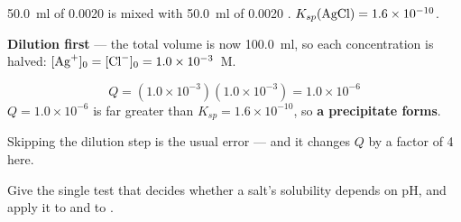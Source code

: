 \documentclass{apchem-notes}
\begin{document}
\begin{workedexample}
\SI{50.0}{\milli\litre} of \SI{0.0020}{\Molar}  is mixed with
\SI{50.0}{\milli\litre} of \SI{0.0020}{\Molar} .
$K_{sp}(\ce{AgCl}) = 1.6\times10^{-10}$.

\textbf{Dilution first} --- the total volume is now
\SI{100.0}{\milli\litre}, so each concentration is halved:
$[\ce{Ag+}]_0 = [\ce{Cl-}]_0 = 1.0\times10^{-3}$~M.

\[ Q = (1.0\times10^{-3})(1.0\times10^{-3}) = 1.0\times10^{-6} \]
$Q = 1.0\times10^{-6}$ is far greater than
$K_{sp} = 1.6\times10^{-10}$, so \textbf{a precipitate forms}.

Skipping the dilution step is the usual error --- and it changes $Q$ by a
factor of 4 here.
\end{workedexample}

\begin{exitticket}
Give the single test that decides whether a salt's solubility depends on
pH, and apply it to  and to .
\end{exitticket}
\end{document}
